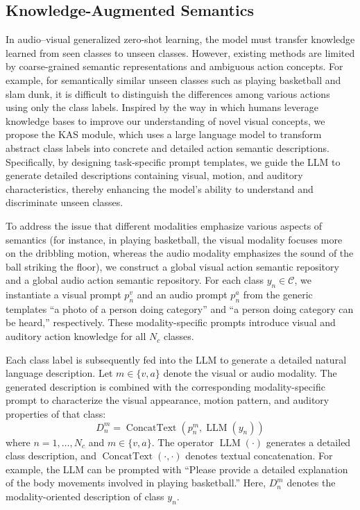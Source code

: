 \documentclass[10pt,journal,twoside]{IEEEtran}
\begin{document}
\subsection{Knowledge-Augmented Semantics}
In audio–visual generalized zero-shot learning, the model must transfer knowledge learned from seen classes to unseen classes. However, existing methods are limited by coarse-grained semantic representations and ambiguous action concepts. For example, for semantically similar unseen classes such as playing basketball and slam dunk, it is difficult to distinguish the differences among various actions using only the class labels. Inspired by the way in which humans leverage knowledge bases to improve our understanding of novel visual concepts, we propose the KAS module, which uses a large language model to transform abstract class labels into concrete and detailed action semantic descriptions. Specifically, by designing task-specific prompt templates, we guide the LLM to generate detailed descriptions containing visual, motion, and auditory characteristics, thereby enhancing the model’s ability to understand and discriminate unseen classes.



To address the issue that different modalities emphasize various aspects of semantics (for instance, in playing basketball, the visual modality focuses more on the dribbling motion, whereas the audio modality emphasizes the sound of the ball striking the floor), we construct a global visual action semantic repository and a global audio action semantic repository. For each class $y_n\in\mathcal{C}$, we instantiate a visual prompt $p_n^v$ and an audio prompt $p_n^a$ from the generic templates “a photo of a person doing {category}” and “a person doing {category} can be heard,” respectively. These modality-specific prompts introduce visual and auditory action knowledge for all $N_c$ classes.


Each class label is subsequently fed into the LLM to generate a detailed natural language description. Let $m\in\{v,a\}$ denote the visual or audio modality. The generated description is combined with the corresponding modality-specific prompt to characterize the visual appearance, motion pattern, and auditory properties of that class:
\begin{equation}
D_n^m=\operatorname{ConcatText}\left(p_n^m,\operatorname{LLM}(y_n)\right)
\end{equation}
where $n=1,\ldots,N_c$ and $m\in\{v,a\}$. The operator $\operatorname{LLM}(\cdot)$ generates a detailed class description, and $\operatorname{ConcatText}(\cdot,\cdot)$ denotes textual concatenation. For example, the LLM can be prompted with “Please provide a detailed explanation of the body movements involved in playing basketball.” Here, $D_n^m$ denotes the modality-oriented description of class $y_n$.
\end{document}
